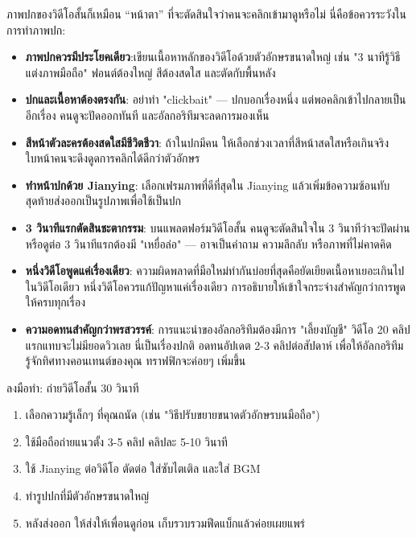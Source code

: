 
ภาพปกของวิดีโอสั้นก็เหมือน “หน้าตา” ที่จะตัดสินใจว่าคนจะคลิกเข้ามาดูหรือไม่ นี่คือข้อควรระวังในการทำภาพปก:

\begin{itemize}
  \item \textbf{ภาพปกควรมีประโยคเดียว}:เขียนเนื้อหาหลักของวิดีโอด้วยตัวอักษรขนาดใหญ่ เช่น "3 นาทีรู้วิธีแต่งภาพมือถือ" ฟอนต์ต้องใหญ่ สีต้องสดใส และตัดกับพื้นหลัง
  \item \textbf{ปกและเนื้อหาต้องตรงกัน}: อย่าทำ "clickbait" — ปกบอกเรื่องหนึ่ง แต่พอคลิกเข้าไปกลายเป็นอีกเรื่อง คนดูจะปัดออกทันที และอัลกอริทึมจะลดการมองเห็น
  \item \textbf{สีหน้าตัวละครต้องสดใสมีชีวิตชีวา}: ถ้าในปกมีคน ให้เลือกช่วงเวลาที่สีหน้าสดใสหรือเกินจริง ใบหน้าคนจะดึงดูดการคลิกได้ดีกว่าตัวอักษร
  \item \textbf{ทำหน้าปกด้วย Jianying}: เลือกเฟรมภาพที่ดีที่สุดใน Jianying แล้วเพิ่มข้อความซ้อนทับ สุดท้ายส่งออกเป็นรูปภาพเพื่อใช้เป็นปก
\end{itemize}


\begin{itemize}
  \item \textbf{3 วินาทีแรกตัดสินชะตากรรม}: บนแพลตฟอร์มวิดีโอสั้น คนดูจะตัดสินใจใน 3 วินาทีว่าจะปัดผ่านหรือดูต่อ 3 วินาทีแรกต้องมี "เหยื่อล่อ" — อาจเป็นคำถาม ความลึกลับ หรือภาพที่ไม่คาดคิด
  \item \textbf{หนึ่งวิดีโอพูดแค่เรื่องเดียว}: ความผิดพลาดที่มือใหม่ทำกันบ่อยที่สุดคือยัดเยียดเนื้อหาเยอะเกินไปในวิดีโอเดียว หนึ่งวิดีโอควรแก้ปัญหาแค่เรื่องเดียว การอธิบายให้เข้าใจกระจ่างสำคัญกว่าการพูดให้ครบทุกเรื่อง
  \item \textbf{ความอดทนสำคัญกว่าพรสวรรค์}: การแนะนำของอัลกอริทึมต้องมีการ "เลี้ยงบัญชี" วิดีโอ 20 คลิปแรกแทบจะไม่มียอดวิวเลย นี่เป็นเรื่องปกติ อดทนอัปเดต 2-3 คลิปต่อสัปดาห์ เพื่อให้อัลกอริทึมรู้จักทิศทางคอนเทนต์ของคุณ ทราฟฟิกจะค่อยๆ เพิ่มขึ้น
\end{itemize}

\begin{tcbpractice}{ลงมือทำ: ถ่ายวิดีโอสั้น 30 วินาที}
\begin{enumerate}
  \item เลือกความรู้เล็กๆ ที่คุณถนัด (เช่น "วิธีปรับขยายขนาดตัวอักษรบนมือถือ")
  \item ใช้มือถือถ่ายแนวตั้ง 3-5 คลิป คลิปละ 5-10 วินาที
  \item ใช้ Jianying ต่อวิดีโอ ตัดต่อ ใส่ซับไตเติล และใส่ BGM
  \item ทำรูปปกที่มีตัวอักษรขนาดใหญ่
  \item หลังส่งออก ให้ส่งให้เพื่อนดูก่อน เก็บรวบรวมฟีดแบ็กแล้วค่อยเผยแพร่
\end{enumerate}

\end{tcbpractice}

